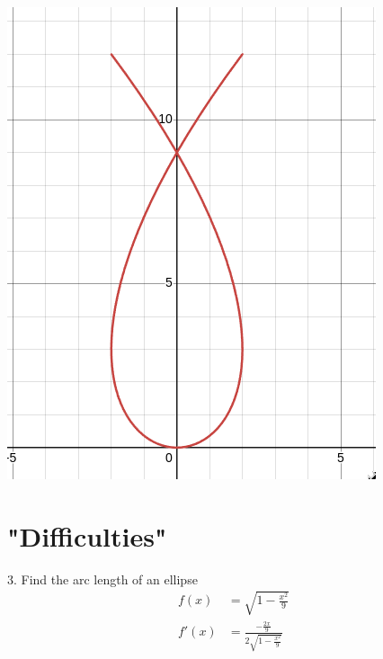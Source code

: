 \documentclass[10pt]{extarticle}
\begin{document}
\begin{center}
    \includegraphics[height = 0.3\textheight]{Graph.png}
\end{center}



\vspace{15cm}

\section{"Difficulties"}
3. Find the arc length of an ellipse
\begin{align}
    f(x) &= \sqrt{1-\frac{x^2}{9}} \\
    f'(x) &= \frac{-\frac{2x}{9}}{2\sqrt{1-\frac{x^2}{9}}}
\end{align}

\begin{center}
    \end{center}
\end{document}
